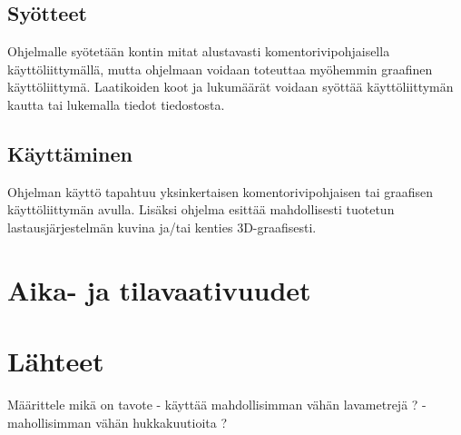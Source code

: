 \documentclass[a4paper,12pt, titlepage]{article}
\begin{document}
\subsection*{Syötteet}
Ohjelmalle syötetään kontin mitat alustavasti komentorivipohjaisella käyttöliittymällä, mutta ohjelmaan voidaan toteuttaa myöhemmin graafinen käyttöliittymä. Laatikoiden koot ja lukumäärät voidaan syöttää käyttöliittymän kautta tai lukemalla tiedot tiedostosta.

\subsection*{Käyttäminen}
Ohjelman käyttö tapahtuu yksinkertaisen komentorivipohjaisen tai graafisen käyttöliittymän avulla. Lisäksi ohjelma esittää mahdollisesti tuotetun lastausjärjestelmän kuvina ja/tai kenties 3D-graafisesti.

\section*{Aika- ja tilavaativuudet}

\section*{Lähteet}






Määrittele mikä on tavote
- käyttää mahdollisimman vähän lavametrejä ? 
- mahollisimman vähän hukkakuutioita ?
\end{document}
